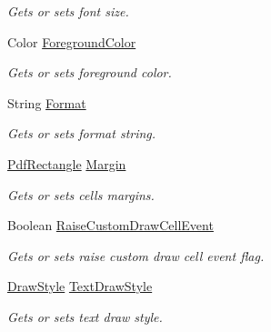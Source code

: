 \begin{DoxyCompactItemize}
\begin{DoxyCompactList}\small\item\em Gets or sets font size. \end{DoxyCompactList}\item 
Color \hyperlink{class_pdf_file_writer_1_1_pdf_table_style_a376023045ec65bbd5c72df749cf8620c}{Foreground\+Color}
\begin{DoxyCompactList}\small\item\em Gets or sets foreground color. \end{DoxyCompactList}\item 
String \hyperlink{class_pdf_file_writer_1_1_pdf_table_style_af66d0e0252bfaf5f4ae226e43d70f093}{Format}
\begin{DoxyCompactList}\small\item\em Gets or sets format string. \end{DoxyCompactList}\item 
\hyperlink{class_pdf_file_writer_1_1_pdf_rectangle}{Pdf\+Rectangle} \hyperlink{class_pdf_file_writer_1_1_pdf_table_style_a12c573207099707c86dba58f33b7dbd5}{Margin}
\begin{DoxyCompactList}\small\item\em Gets or sets cell\textquotesingle{}s margins. \end{DoxyCompactList}\item 
Boolean \hyperlink{class_pdf_file_writer_1_1_pdf_table_style_a051ae047e5ab3ed7746ad16c4f6525b4}{Raise\+Custom\+Draw\+Cell\+Event}
\begin{DoxyCompactList}\small\item\em Gets or sets raise custom draw cell event flag. \end{DoxyCompactList}\item 
\hyperlink{namespace_pdf_file_writer_a2bcdd73c6cedab15d6f6c2a64333ef39}{Draw\+Style} \hyperlink{class_pdf_file_writer_1_1_pdf_table_style_a79266ca996701ec2d0f8cad46e80c22c}{Text\+Draw\+Style}
\begin{DoxyCompactList}\small\item\em Gets or sets text draw style. \end{DoxyCompactList}\item 

\end{DoxyCompactItemize}
